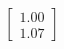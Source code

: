 \documentclass[preview]{standalone}
\begin{document}
\begin{align*}
\begin{bmatrix} 1.00 \\ 1.07 \end{bmatrix}
\end{align*}
\end{document}
